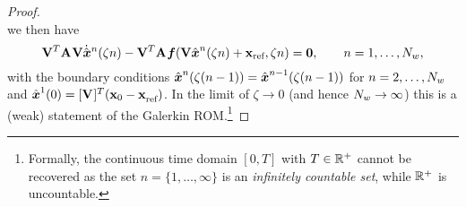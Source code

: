\begin{proof}
\begin{equation*}
\end{equation*}
we then have 
\begin{equation*}
\basisspace^T \stweightingMatArgt{}{\zeta n} \basisspace \genstateDotArg{n}{\zeta n} -  \basisspace^T \stweightingMatArgt{}{\zeta n} \velocity(\basisspace \genstateArg{n}{\zeta n} + \stateIntercept ,\zeta n) = \bz, \qquad n=1,\ldots,\nslabs, 
\end{equation*}
with the boundary conditions  $\genstateArg{n}{\zeta (n-1)} = \genstateArg{n-1}{\zeta(n-1)}$ for $n=2,\ldots,\nslabs$ and $\genstateArg{1}{0} = \genstateIC $. %
In the limit of $\zeta \rightarrow 0$ (and hence $\nslabs \rightarrow \infty$) this is a (weak) statement of the Galerkin ROM.\footnote{Formally, the continuous time domain $[0,T]$ with $T \in \RR{+}$ cannot be recovered as the set $n=\{1,\ldots,\infty\}$ is an \textit{infinitely countable set}, while $\RR{+}$ is uncountable.}
\end{proof}
%
